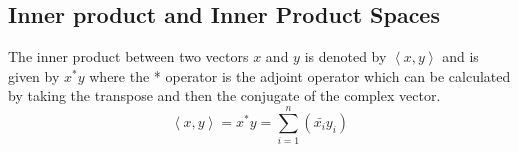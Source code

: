 \documentclass[a4paper,12pt]{article}
\newcommand\norm[1]{\left\lVert#1\right\rVert}
\begin{document}
	\subsection{Inner product and Inner Product Spaces} The inner product between two vectors $x$ and $y$ is denoted by $\left\langle x, y \right\rangle$ and is given by $x^{*}y$ where the * operator is the adjoint operator which can be calculated by taking the transpose and then the conjugate of the complex vector.
		\begin{equation*}
			\left\langle x, y \right\rangle = x^{*}y = \sum\limits_{i=1}^n (\bar{x_{i}}y_{i})
			\label{in}
		\end{equation*}
		
\end{document}
